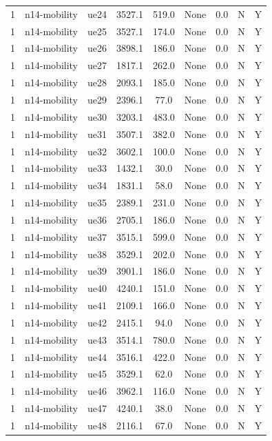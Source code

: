\begin{table}[ht]
\begin{tabular}{|c|c|c|c|c|c|c|c|c|}
1 & n14-mobility & ue24 & 3527.1 & 519.0 & None & 0.0 & N & Y \\
1 & n14-mobility & ue25 & 3527.1 & 174.0 & None & 0.0 & N & Y \\
1 & n14-mobility & ue26 & 3898.1 & 186.0 & None & 0.0 & N & Y \\
1 & n14-mobility & ue27 & 1817.1 & 262.0 & None & 0.0 & N & Y \\
1 & n14-mobility & ue28 & 2093.1 & 185.0 & None & 0.0 & N & Y \\
1 & n14-mobility & ue29 & 2396.1 & 77.0 & None & 0.0 & N & Y \\
1 & n14-mobility & ue30 & 3203.1 & 483.0 & None & 0.0 & N & Y \\
1 & n14-mobility & ue31 & 3507.1 & 382.0 & None & 0.0 & N & Y \\
1 & n14-mobility & ue32 & 3602.1 & 100.0 & None & 0.0 & N & Y \\
1 & n14-mobility & ue33 & 1432.1 & 30.0 & None & 0.0 & N & Y \\
1 & n14-mobility & ue34 & 1831.1 & 58.0 & None & 0.0 & N & Y \\
1 & n14-mobility & ue35 & 2389.1 & 231.0 & None & 0.0 & N & Y \\
1 & n14-mobility & ue36 & 2705.1 & 186.0 & None & 0.0 & N & Y \\
1 & n14-mobility & ue37 & 3515.1 & 599.0 & None & 0.0 & N & Y \\
1 & n14-mobility & ue38 & 3529.1 & 202.0 & None & 0.0 & N & Y \\
1 & n14-mobility & ue39 & 3901.1 & 186.0 & None & 0.0 & N & Y \\
1 & n14-mobility & ue40 & 4240.1 & 151.0 & None & 0.0 & N & Y \\
1 & n14-mobility & ue41 & 2109.1 & 166.0 & None & 0.0 & N & Y \\
1 & n14-mobility & ue42 & 2415.1 & 94.0 & None & 0.0 & N & Y \\
1 & n14-mobility & ue43 & 3514.1 & 780.0 & None & 0.0 & N & Y \\
1 & n14-mobility & ue44 & 3516.1 & 422.0 & None & 0.0 & N & Y \\
1 & n14-mobility & ue45 & 3529.1 & 62.0 & None & 0.0 & N & Y \\
1 & n14-mobility & ue46 & 3962.1 & 116.0 & None & 0.0 & N & Y \\
1 & n14-mobility & ue47 & 4240.1 & 38.0 & None & 0.0 & N & Y \\
1 & n14-mobility & ue48 & 2116.1 & 67.0 & None & 0.0 & N & Y \\

\end{tabular}
\end{table}
